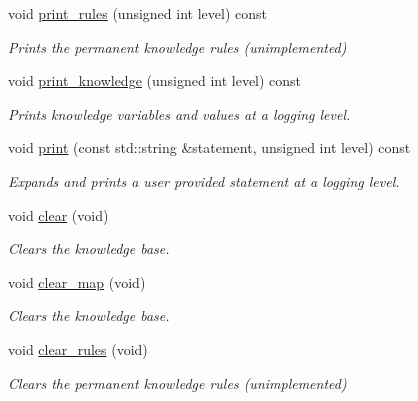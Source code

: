 \begin{DoxyCompactItemize}
void \hyperlink{classMadara_1_1Knowledge__Engine_1_1Knowledge__Base__Impl_a3f639f7a176d733109c84b4abe906b60}{print\_\-rules} (unsigned int level) const 
\begin{DoxyCompactList}\small\item\em Prints the permanent knowledge rules (unimplemented) \item\end{DoxyCompactList}\item 
void \hyperlink{classMadara_1_1Knowledge__Engine_1_1Knowledge__Base__Impl_af00bd1f3b29fe097139d071730c7b53b}{print\_\-knowledge} (unsigned int level) const 
\begin{DoxyCompactList}\small\item\em Prints knowledge variables and values at a logging level. \item\end{DoxyCompactList}\item 
void \hyperlink{classMadara_1_1Knowledge__Engine_1_1Knowledge__Base__Impl_a50311163682239e72d26924e47214ee3}{print} (const std::string \&statement, unsigned int level) const 
\begin{DoxyCompactList}\small\item\em Expands and prints a user provided statement at a logging level. \item\end{DoxyCompactList}\item 
void \hyperlink{classMadara_1_1Knowledge__Engine_1_1Knowledge__Base__Impl_a3804ce302af2edf93bec131ab72c3f22}{clear} (void)
\begin{DoxyCompactList}\small\item\em Clears the knowledge base. \item\end{DoxyCompactList}\item 
void \hyperlink{classMadara_1_1Knowledge__Engine_1_1Knowledge__Base__Impl_a5d7e19aa38acfe06a9d3264b0ddf948b}{clear\_\-map} (void)
\begin{DoxyCompactList}\small\item\em Clears the knowledge base. \item\end{DoxyCompactList}\item 
void \hyperlink{classMadara_1_1Knowledge__Engine_1_1Knowledge__Base__Impl_aabbfd5799ad771a87260b2e65e5475d3}{clear\_\-rules} (void)
\begin{DoxyCompactList}\small\item\em Clears the permanent knowledge rules (unimplemented) \item\end{DoxyCompactList}\item 

\end{DoxyCompactItemize}
